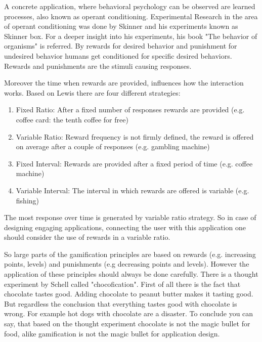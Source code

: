 A concrete application, where behavioral psychology can be observed are learned processes, also known as operant conditioning. Experimental Research in the area of operant conditioning was done by Skinner and his experiments known as Skinner box. For a deeper insight into his experiments, his book "The behavior of organisms" \cite{skinnerBehaviorOrganisms1938} is referred. By rewards for desired behavior and punishment for undesired behavior humans get conditioned for specific desired behaviors. Rewards and punishments are the stimuli causing responses. \cite[p. 11]{lewisIrresistibleAppsMotivational2014}

Moreover the time when rewards are provided, influences how the interaction works.
Based on Lewis \cite[p. 10]{lewisIrresistibleAppsMotivational2014} there are four different strategies:
\begin{enumerate}
	\item Fixed Ratio: After a fixed number of responses rewards are provided (e.g. coffee card: the tenth coffee for free)
	\item Variable Ratio: Reward frequency is not firmly defined, the reward is offered on average after a couple of responses (e.g. gambling machine)
	\item Fixed Interval: Rewards are provided after a fixed period of time (e.g. coffee machine)
	\item Variable Interval: The interval in which rewards are offered is variable (e.g. fishing)
\end{enumerate}

The most response over time is generated by variable ratio strategy. So in case of designing engaging applications, connecting the user with this application one should consider the use of rewards in a variable ratio. \cite[p. 11]{lewisIrresistibleAppsMotivational2014}

So large parts of the gamification principles are based on rewards (e.g. increasing points, levels) and punishments (e.g decreasing points and levels). However the application of these principles should always be done carefully. There is a thought experiment by Schell called "chocofication". First of all there is the fact that chocolate tastes good. Adding chocolate to peanut butter makes it tasting good. But regardless the conclusion that everything tastes good with chocolate is wrong. For example hot dogs with chocolate are a disaster. 
To conclude you can say, that based on the thought experiment chocolate is not the magic bullet for food, alike gamification is not the magic bullet for application design. \cite[p. 12]{lewisIrresistibleAppsMotivational2014}


